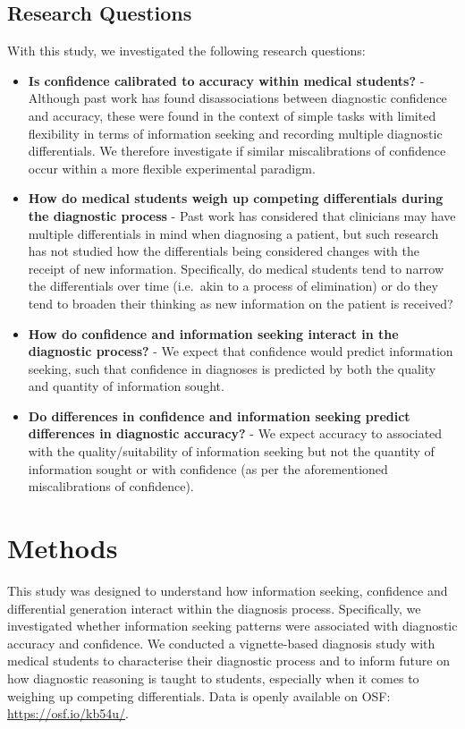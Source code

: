 \documentclass[a4paper, nobind]{templates/ociamthesis}
\providecommand{\tightlist}{%
  \setlength{\itemsep}{0pt}\setlength{\parskip}{0pt}}
\begin{document}
\subsection{Research Questions}\label{research-questions}

With this study, we investigated the following research questions:

\begin{itemize}
\tightlist
\item
  \textbf{Is confidence calibrated to accuracy within medical students?} - Although past work has found disassociations between diagnostic confidence and accuracy, these were found in the context of simple tasks with limited flexibility in terms of information seeking and recording multiple diagnostic differentials. We therefore investigate if similar miscalibrations of confidence occur within a more flexible experimental paradigm.
\item
  \textbf{How do medical students weigh up competing differentials during the diagnostic process} - Past work has considered that clinicians may have multiple differentials in mind when diagnosing a patient, but such research has not studied how the differentials being considered changes with the receipt of new information. Specifically, do medical students tend to narrow the differentials over time (i.e.~akin to a process of elimination) or do they tend to broaden their thinking as new information on the patient is received?
\item
  \textbf{How do confidence and information seeking interact in the diagnostic process?} - We expect that confidence would predict information seeking, such that confidence in diagnoses is predicted by both the quality and quantity of information sought.
\item
  \textbf{Do differences in confidence and information seeking predict differences in diagnostic accuracy?} - We expect accuracy to associated with the quality/suitability of information seeking but not the quantity of information sought or with confidence (as per the aforementioned miscalibrations of confidence).
\end{itemize}

\section{Methods}\label{methods-1}

This study was designed to understand how information seeking, confidence and differential generation interact within the diagnosis process. Specifically, we investigated whether information seeking patterns were associated with diagnostic accuracy and confidence. We conducted a vignette-based diagnosis study with medical students to characterise their diagnostic process and to inform future on how diagnostic reasoning is taught to students, especially when it comes to weighing up competing differentials. Data is openly available on OSF: \url{https://osf.io/kb54u/}.
\end{document}
